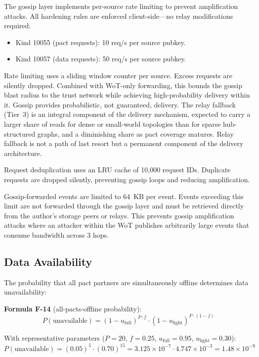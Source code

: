 \documentclass[11pt,a4paper]{article}
\begin{document}
The gossip layer implements per-source rate limiting to prevent amplification attacks. All hardening rules are enforced client-side---no relay modifications required:

\begin{itemize}
  \item Kind 10055 (pact requests): 10 req/s per source pubkey.
  \item Kind 10057 (data requests): 50 req/s per source pubkey.
\end{itemize}

Rate limiting uses a sliding window counter per source. Excess requests are silently dropped. Combined with WoT-only forwarding, this bounds the gossip blast radius to the trust network while achieving high-probability delivery within it. Gossip provides probabilistic, not guaranteed, delivery. The relay fallback (Tier~3) is an integral component of the delivery mechanism, expected to carry a larger share of reads for dense or small-world topologies than for sparse hub-structured graphs, and a diminishing share as pact coverage matures. Relay fallback is not a path of last resort but a permanent component of the delivery architecture.

Request deduplication uses an LRU cache of 10,000 request IDs. Duplicate requests are dropped silently, preventing gossip loops and reducing amplification.

Gossip-forwarded events are limited to 64~KB per event. Events exceeding this limit are not forwarded through the gossip layer and must be retrieved directly from the author's storage peers or relays. This prevents gossip amplification attacks where an attacker within the WoT publishes arbitrarily large events that consume bandwidth across 3 hops.

\subsection{Data Availability}

The probability that all pact partners are simultaneously offline determines data unavailability:

\textbf{Formula F-14} (all-pacts-offline probability):
\begin{equation}
  P(\text{unavailable}) = (1 - u_{\text{full}})^{P \cdot f} \cdot (1 - u_{\text{light}})^{P \cdot (1-f)}
\end{equation}

With representative parameters ($P=20$, $f=0.25$, $u_{\text{full}}=0.95$, $u_{\text{light}}=0.30$):
\begin{equation}
  P(\text{unavailable}) = (0.05)^5 \cdot (0.70)^{15} = 3.125 \times 10^{-7} \cdot 4.747 \times 10^{-3} = 1.48 \times 10^{-9}
\end{equation}
\end{document}
